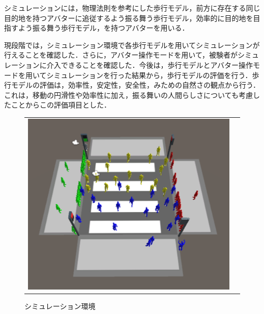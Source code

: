 \documentclass[twocolumn]{jarticle}%
\begin{document}
シミュレーションには，物理法則を参考にした歩行モデル\cite{Akuzawa}，前方に存在する同じ目的地を持つアバターに追従するよう振る舞う歩行モデル\cite{Sasagawa}，効率的に目的地を目指すよう振る舞う歩行モデル，を持つアバターを用いる．

現段階では，シミュレーション環境で各歩行モデルを用いてシミュレーションが行えることを確認した．さらに，アバター操作モードを用いて，被験者がシミュレーションに介入できることを確認した．今後は，歩行モデルとアバター操作モードを用いてシミュレーションを行った結果から，歩行モデルの評価を行う．歩行モデルの評価は，効率性\cite{Iryo-Youryou}，安定性\cite{Iryo-Youryou}，安全性，みための自然さ\cite{Iryo-VRE}の観点から行う．これは，移動の円滑性や効率性に加え，振る舞いの人間らしさについても考慮したことからこの評価項目とした．

\begin{figure}[H]
    \begin{tabular}{cc}
      \begin{minipage}[t]{0.45\hsize}
        \centering
        \includegraphics[keepaspectratio, scale=0.11]{images/environment.JPG}
        \caption{シミュレーション環境}
        \label{fig:environment}
      \end{minipage} &
      \begin{minipage}[t]{0.45\hsize}
        \centering

\end{minipage}
\end{tabular}
\end{figure}
\end{document}
